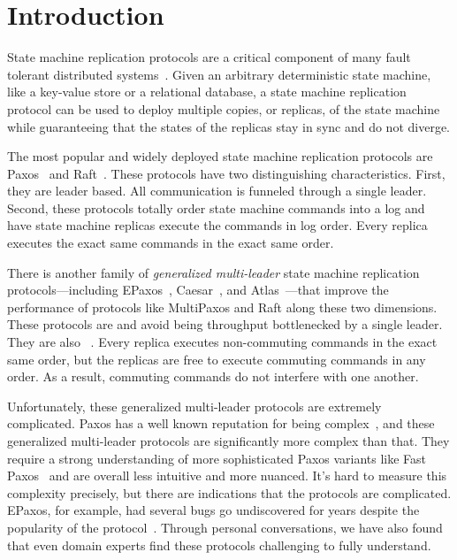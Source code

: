 \section{Introduction}
State machine replication protocols are a critical component of many fault
tolerant distributed systems~\cite{burrows2006chubby, corbett2013spanner,
thomson2012calvin, baker2011megastore, taft2020cockroachdb}. Given an arbitrary
deterministic state machine, like a key-value store or a relational database, a
state machine replication protocol can be used to deploy multiple copies, or
replicas, of the state machine while guaranteeing that the states of the
replicas stay in sync and do not diverge.

The most popular and widely deployed state machine replication protocols are
Paxos~\cite{lamport1998part, burrows2006chubby, corbett2013spanner} and
Raft~\cite{ongaro2014search, taft2020cockroachdb, tidb2019website,
yugabyte2019website}. These protocols have two distinguishing characteristics.
First, they are leader based. All communication is funneled through a single
leader. Second, these protocols totally order state machine commands into a log
and have state machine replicas execute the commands in log order. Every
replica executes the exact same commands in the exact same order.

There is another family of \emph{generalized multi-leader} state machine
replication protocols---including EPaxos~\cite{moraru2013there},
Caesar~\cite{arun2017speeding}, and Atlas~\cite{enes2020state}---that improve
the performance of protocols like MultiPaxos and Raft along these two
dimensions. These protocols are  and avoid being
throughput bottlenecked by a single leader. They are also
~\cite{lamport2005generalized, losa2016brief}.
%
Every replica executes non-commuting commands in the exact same order, but the
replicas are free to execute commuting commands in any order. As a result,
commuting commands do not interfere with one another.

Unfortunately, these generalized multi-leader protocols are extremely
complicated. Paxos has a well known reputation for being
complex~\cite{lamport2001paxos, van2015paxos, ongaro2014search}, and these
generalized multi-leader protocols are significantly more complex than that.
They require a strong understanding of more sophisticated Paxos variants like
Fast Paxos~\cite{lamport2006fast} and are overall less intuitive and more
nuanced. It's hard to measure this complexity precisely, but there are
indications that the protocols are complicated. EPaxos, for example, had several
bugs go undiscovered for years despite the popularity of the
protocol~\cite{sutra2011fast}. Through personal conversations, we have also
found that even domain experts find these protocols challenging to fully
understand.


